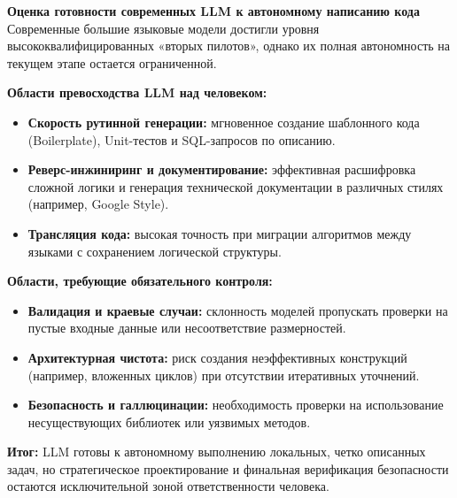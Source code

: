 \documentclass[oneside,a4paper,14pt]{extarticle} %
\begin{document}
	\textbf{Оценка готовности современных LLM к автономному написанию кода}
	\newline
	Современные большие языковые модели достигли уровня высококвалифицированных «вторых пилотов», однако их полная автономность на текущем этапе остается ограниченной.
	
	\textbf{Области превосходства LLM над человеком:}
	\begin{itemize}
		\item \textbf{Скорость рутинной генерации:} мгновенное создание шаблонного кода (Boilerplate), Unit-тестов и SQL-запросов по описанию.
		\item \textbf{Реверс-инжиниринг и документирование:} эффективная расшифровка сложной логики и генерация технической документации в различных стилях (например, Google Style).
		\item \textbf{Трансляция кода:} высокая точность при миграции алгоритмов между языками с сохранением логической структуры.
	\end{itemize}
	
	\textbf{Области, требующие обязательного контроля:}
	\begin{itemize}
		\item \textbf{Валидация и краевые случаи:} склонность моделей пропускать проверки на пустые входные данные или несоответствие размерностей.
		\item \textbf{Архитектурная чистота:} риск создания неэффективных конструкций (например, вложенных циклов) при отсутствии итеративных уточнений.
		\item \textbf{Безопасность и галлюцинации:} необходимость проверки на использование несуществующих библиотек или уязвимых методов.
	\end{itemize}
	\textbf{Итог:} LLM готовы к автономному выполнению локальных, четко описанных задач, но стратегическое проектирование и финальная верификация безопасности остаются исключительной зоной ответственности человека.
	
\end{document}
